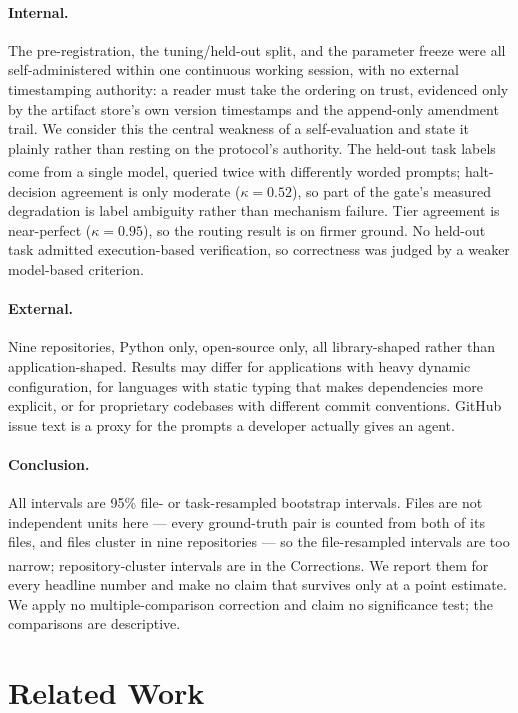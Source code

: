 \documentclass[sigconf,review,anonymous]{acmart}
\newcommand{\corr}{\textsuperscript{\dag}}
\begin{document}
\paragraph{Internal.} The pre-registration, the tuning/held-out split, and the parameter freeze were all
self-administered within one continuous working session, with no external timestamping authority: a reader
must take the ordering on trust, evidenced only by the artifact store's own version timestamps and the
append-only amendment trail. We consider this the central weakness of a self-evaluation and state it plainly
rather than resting on the protocol's authority. The held-out task labels come from a single model,
queried twice with differently worded prompts\corr{}; halt-decision
agreement is only moderate ($\kappa = 0.52$), so part of the gate's measured degradation is
label ambiguity rather than mechanism failure. Tier agreement is near-perfect ($\kappa = 0.95$),
so the routing result is on firmer ground. No held-out task admitted execution-based
verification, so correctness was judged by a weaker model-based criterion.

\paragraph{External.} Nine repositories, Python only, open-source only, all library-shaped
rather than application-shaped. Results may differ for applications with heavy dynamic
configuration, for languages with static typing that makes dependencies more explicit, or for
proprietary codebases with different commit conventions. GitHub issue text is a proxy for the
prompts a developer actually gives an agent.

\paragraph{Conclusion.} All intervals are 95\% file- or task-resampled bootstrap intervals.
Files are not independent units here --- every ground-truth pair is counted from both of its
files, and files cluster in nine repositories --- so the file-resampled intervals are too narrow;
repository-cluster intervals are in the Corrections\corr{}.
We report them for every headline number and make no claim that survives only at a point
estimate. We apply no multiple-comparison correction and claim no significance test; the
comparisons are descriptive.

\section{Related Work}\label{sec:related}
\end{document}
